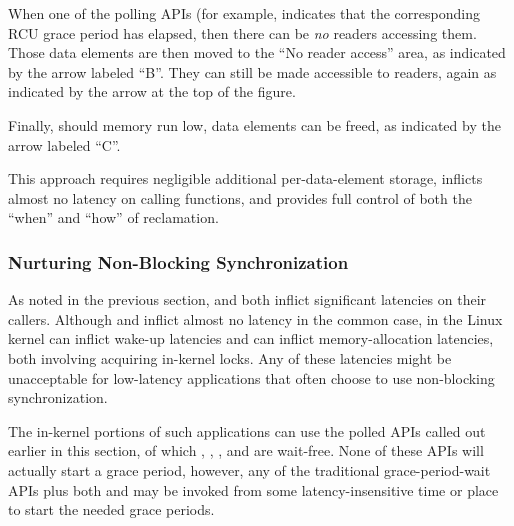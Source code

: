 When one of the polling APIs (for example, 
indicates that the corresponding RCU grace period has elapsed, then there
can be \emph{no} readers accessing them.
Those data elements are then moved to the ``No reader access'' area, as
indicated by the arrow labeled ``B''\@.
They can still be made accessible to readers, again as indicated by the
arrow at the top of the figure.

Finally, should memory run low, data elements can be freed, as indicated
by the arrow labeled ``C''.

This approach requires negligible additional per-data-element storage,
inflicts almost no latency on calling functions, and provides full
control of both the ``when'' and ``how'' of reclamation.

\subsubsection{Nurturing Non-Blocking Synchronization}
\label{sec:together:Nurturing Non-Blocking Synchronization}

As noted in the previous section,  and
 both inflict significant latencies
on their callers.
Although  and  inflict almost no
latency in the common case, in the Linux kernel  can
inflict wake-up latencies and  can inflict
memory-allocation latencies, both involving acquiring in-kernel locks.
Any of these latencies might be unacceptable for low-latency applications
that often choose to use non-blocking synchronization.

The in-kernel portions of such applications can use the polled APIs called
out earlier in this section, of which ,
,
, and
are wait-free.
None of these APIs will actually start a grace period,
however, any of the traditional grace-period-wait
APIs plus both  and
 may be invoked from some
latency-insensitive time or place to start the needed grace periods.
